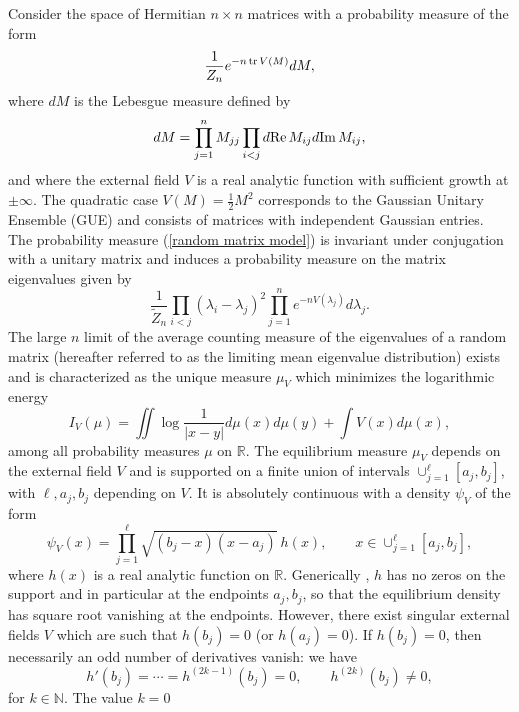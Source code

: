 \documentclass[11pt,fleqn]{article}
\numberwithin{equation}{section}
\def\tr{{\rm tr \,}}
\def\Re{{\rm Re \,}}
\def\Im{{\rm Im \,}}
\begin{document}
Consider the space of Hermitian $n\times n$ matrices with a
probability measure of the form
\begin{equation}\label{random matrix model}
\frac{1}{Z_{n}}e^{-n\,\tr V(M)}dM,
\end{equation}
where $dM$ is the Lebesgue measure defined by
\[dM=\prod_{j=1}^n M_{jj}\prod_{i<j}d\Re M_{ij} d\Im M_{ij},\]
and where the external field $V$ is a real analytic function with
sufficient growth at $\pm\infty$. The quadratic case
$V(M)=\frac{1}{2}M^2$ corresponds to the Gaussian Unitary Ensemble
(GUE) and consists of matrices with independent Gaussian entries.
The probability measure (\ref{random matrix model}) is invariant
under conjugation with a unitary matrix and induces a probability
measure on the matrix eigenvalues given by
\begin{equation}
\frac{1}{\tilde
Z_n}\prod_{i<j}(\lambda_i-\lambda_j)^2\prod_{j=1}^n e^{-nV(\lambda_j)}d\lambda_j.
\end{equation}
The large $n$ limit of the average counting measure of the
eigenvalues of a random matrix (hereafter referred to as the limiting mean eigenvalue
distribution) exists and is characterized as the unique measure
$\mu_V$ which minimizes the logarithmic energy \cite{Deift}
\begin{equation}
I_V(\mu)=\iint \log\frac{1}{|x-y|}d\mu(x)d\mu(y)+\int V(x)d\mu(x),
\end{equation}
among all probability measures $\mu$ on $\mathbb R$. The equilibrium
measure $\mu_V$ depends on the external field $V$ and is supported on a
finite union of intervals $\cup_{j=1}^\ell[a_j,b_j]$, with $\ell, a_j, b_j$
depending on $V$. It is absolutely continuous with a density
$\psi_V$ of the form \cite{DKM}
\begin{equation}
\psi_V(x)=\prod_{j=1}^\ell \sqrt{(b_j-x)(x-a_j)}\ h(x),\qquad x\in
\cup_{j=1}^\ell[a_j,b_j],
\end{equation}
where $h(x)$ is a real analytic function on $\mathbb R$. Generically
\cite{KM}, $h$ has no zeros on the support and in particular at the
endpoints $a_j, b_j$, so that the equilibrium density has square
root vanishing at the endpoints. However, there exist singular
external fields $V$ which are such that $h(b_j)=0$ (or $h(a_j)=0$).
If $h(b_j)=0$, then necessarily an odd number of derivatives vanish:
we have \begin{equation}\label{hb} h'(b_j)=\cdots = h^{(2k-1)}(b_j)=0, \qquad
h^{(2k)}(b_j)\neq 0,\end{equation} for $k\in\mathbb N$. The value $k=0$
\end{document}

